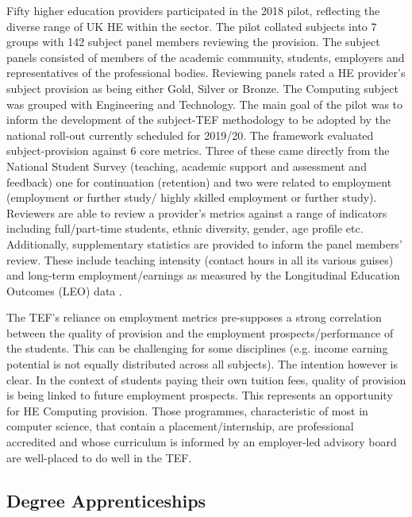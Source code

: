 \documentclass[sigconf]{acmart}
\begin{document}
Fifty higher education providers participated in the 2018 pilot, reflecting the diverse range of UK HE within the sector. The pilot collated subjects into 7 groups with 142 subject panel members reviewing the provision. The subject panels consisted of members of the academic community, students, employers and representatives of the professional bodies. Reviewing panels rated a HE provider's subject provision as being either Gold, Silver or Bronze. The Computing subject was grouped with Engineering and Technology. The main goal of the pilot was to inform the development of the subject-TEF methodology to be adopted by the national roll-out currently scheduled for 2019/20. The framework evaluated subject-provision against 6 core metrics. Three of these came directly from the National Student Survey (teaching, academic support and assessment and feedback) one for continuation (retention) and two were related to employment (employment or further study/ highly skilled employment or further study). Reviewers are able to review a provider's metrics against a range of indicators %
including full/part-time students, ethnic diversity, gender, age profile etc. Additionally, supplementary statistics are provided to inform the panel members' review. These include teaching intensity (contact hours in all its various guises) and long-term employment/earnings as measured by the Longitudinal Education Outcomes (LEO) data \cite{DfE2017a}.

The TEF's reliance on employment metrics pre-supposes a strong correlation between the quality of provision and the employment prospects/performance of the students. This can be challenging for some disciplines (e.g. income earning potential is not equally distributed across all subjects). The intention however is clear. In the context of students paying their own tuition fees, quality of provision is being linked to future employment prospects. This represents an opportunity for HE Computing provision. Those programmes, characteristic of most in computer science,  that contain a placement/internship, are professional accredited and whose curriculum is informed by an employer-led advisory board are well-placed to do well in the TEF. 
\fi 

\subsection{Degree Apprenticeships}\label{sec:DA}
\end{document}
